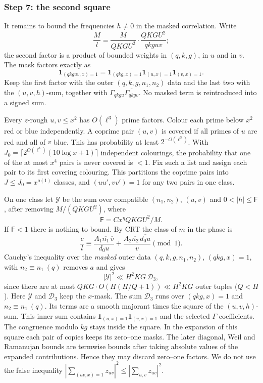 \subsubsection*{Step 7: the second square}
It remains to bound the frequencies $h\ne0$ in the masked
correlation. Write
\[
 \frac Ml=\frac M{QKGU^2}\cdot\frac{QKGU^2}{qkguv};
\]
the second factor is a product of bounded weights in $(q,k,g)$, in $u$ and
in $v$. The mask factors exactly as
\[
 \mathbf1_{(qkguv,x)=1}=
 \mathbf1_{(qkg,x)=1}\mathbf1_{(u,x)=1}\mathbf1_{(v,x)=1}.
\]
Keep the first factor with the outer $(q,k,g,n_1,n_2)$ data and the
last two with the $(u,v,h)$-sum, together with
$\Gamma_{qkgu}\overline{\Gamma_{qkgv}}$. No masked term is reintroduced
into a signed sum.

Every $z$-rough $u,v\le x^2$ has $O(\ell^3)$ prime factors. Colour each prime
below $x^2$ red or blue independently. A coprime pair $(u,v)$ is covered if
all primes of $u$ are red and all of $v$ blue. This has probability at least
$2^{-O(\ell^3)}$. With $J_0=\lceil2^{O(\ell^3)}(10\log x+1)\rceil$ independent
colourings, the probability that one of the at most $x^4$ pairs is never
covered is $<1$. Fix such a list and assign each pair to its first
covering colouring. This partitions the coprime pairs into
$J\le J_0=x^{o(1)}$ classes, and $(uu',vv')=1$ for any two pairs in one
class.

On one class let $\mathcal Y$ be the sum over compatible $(n_1,n_2)$, $(u,v)$
and $0<|h|\le\mathsf F$, after removing $M/(QKGU^2)$, where
\begin{equation}\label{sp:Fcut}
 \mathsf F=Cx^{\eta}QKGU^2/M .
\end{equation}
If $\mathsf F<1$ there is nothing to bound. By CRT the class of $m$ in the
phase is
\[
 \frac c{l}\equiv\frac{A_1\overline{n_1}\,\overline v}{d_0u}
 +\frac{A_2\overline{n_2}\,\overline{d_0u}}v\pmod1 .
\]
Cauchy's inequality over the \emph{masked} outer data
$(q,k,g,n_1,n_2)$, $(qkg,x)=1$, with $n_2\equiv n_1\ (q)$ removes
$a$ and gives
\begin{equation}\label{sp:c58-cs2}
 |\mathcal Y|^2\ll H^2KG\,\mathcal D_3,
\end{equation}
since there are at most
$QKG\cdot O(H(H/Q+1))\ll H^2KG$ outer tuples ($Q<H$).
Here $\mathcal Y$ and $\mathcal D_3$ keep the $x$-mask.
The sum $\mathcal D_3$ runs over $(qkg,x)=1$ and $n_2\equiv n_1\ (q)$. Its terms are
a smooth majorant times the square of the $(u,v,h)$-sum. This inner sum
contains $\mathbf1_{(u,x)=1}\mathbf1_{(v,x)=1}$ and the selected
$\Gamma$ coefficients. The congruence modulo $kg$ stays inside the
square. In the expansion of this square each pair of copies keeps its
zero--one masks. The later diagonal, Weil and Ramanujan bounds are
termwise bounds after taking absolute values of the expanded
contributions. Hence they may discard zero--one factors.
We do not use the false inequality
$|\sum_{(uv,x)=1}z_{uv}|^2\le|\sum_{u,v}z_{uv}|^2$.

